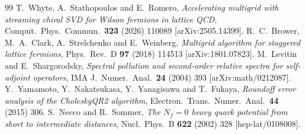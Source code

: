 \documentclass[11pt,a4paper]{article}
\newcounter{alg}
\numberwithin{equation}{section}
\begin{document}
\begin{thebibliography}{99}
 T.~Whyte, A.~Stathopoulos and E.~Romero, \emph{Accelerating multigrid with streaming chiral SVD for Wilson fermions in lattice QCD}, Comput.\ Phys.\ Commun.\ \textbf{323} (2026) 110089 [arXiv:2505.14399].
 R.~C.~Brower, M.~A.~Clark, A.~Strelchenko and E.~Weinberg, \emph{Multigrid algorithm for staggered lattice fermions}, Phys.\ Rev.\ D \textbf{97} (2018) 114513 [arXiv:1801.07823].
 M.~Levitin and E.~Shargorodsky, \emph{Spectral pollution and second-order relative spectra for self-adjoint operators}, IMA J.\ Numer.\ Anal.\ \textbf{24} (2004) 393 [arXiv:math/0212087].
 Y.~Yamamoto, Y.~Nakatsukasa, Y.~Yanagisawa and T.~Fukaya, \emph{Roundoff error analysis of the CholeskyQR2 algorithm}, Electron.\ Trans.\ Numer.\ Anal.\ \textbf{44} (2015) 306.
 S.~Necco and R.~Sommer, \emph{The $N_f=0$ heavy quark potential from short to intermediate distances}, Nucl.\ Phys.\ B \textbf{622} (2002) 328 [hep-lat/0108008].
\end{thebibliography}
\end{document}
